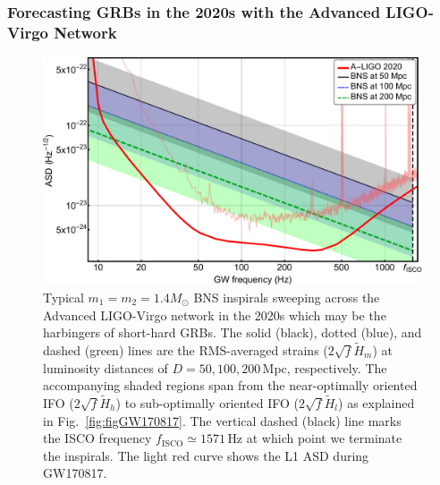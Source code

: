 \documentclass[prd,amsmath,amssymb,aps,floats,amsfonts,notitlepage,superscriptaddress,eqsecnum,nofootinbib,10pt]{revtex4-1}
\begin{document}
\subsubsection{Forecasting GRBs in the 2020s with the Advanced LIGO-Virgo Network}\label{Sec:ALIGO2020}
%
%
\begin{figure}[ht!]
\includegraphics[width=\linewidth]{../Figures/ALigo_strains.pdf}
\caption{Typical $m_1=m_2=1.4 M_\odot$ BNS inspirals sweeping across the Advanced LIGO-Virgo network in the 2020s
which may be the harbingers of short-hard GRBs.
The solid (black), dotted (blue), and dashed (green) lines are the RMS-averaged strains ($2\sqrt{f}\tilde{H}_m$) at luminosity distances of $D=50, 100, 200\,$Mpc, respectively. The accompanying shaded regions span from the near-optimally oriented IFO 
($2\sqrt{f}\tilde{H}_h$) to
sub-optimally oriented IFO ($2\sqrt{f}\tilde{H}_l$) as explained in Fig.~\ref{fig:figGW170817}.
The vertical dashed (black) line marks the ISCO frequency $f_\text{ISCO} \simeq 1571\,$Hz at which point we terminate the inspirals. The light red curve shows the L1 ASD during GW170817.
}
\label{fig:LIGO2020}
\end{figure}
%
%
\end{document}
